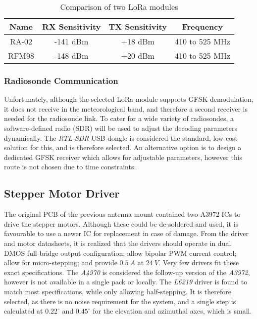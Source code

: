 \begin{table}[!htb]
  \centering
  \renewcommand{\arraystretch}{1.2}
  \begin{tabular}{ |c|c|c|c| }
  \hline
  \textbf{Name}   & \textbf{RX Sensitivity} & \textbf{TX Sensitivity}& \textbf{Frequency} \\
  \hline
  RA-02           & -141 dBm             & +18 dBm              & 410 to 525 MHz     \\
  RFM98           & -148 dBm             & +20 dBm              & 410 to 525 MHz     \\
  \hline
  \end{tabular}
  \caption{Comparison of two LoRa modules}
  \label{tab:rfModules}
\end{table}

\subsubsection{Radiosonde Communication}
Unfortunately, although the selected LoRa module supports GFSK demodulation, it does not receive in the meteorological band, and therefore a second receiver is needed for the radiosonde link. To cater for a wide variety of radiosondes, a software-defined radio (SDR) will be used to adjust the decoding parameters dynamically. The \textit{RTL-SDR} USB dongle is considered the standard, low-cost solution for this, and is therefore selected. An alternative option is to design a dedicated GFSK receiver which allows for adjustable parameters, however this route is not chosen due to time constraints.

\subsection{Stepper Motor Driver}
The original PCB of the previous antenna mount contained two A3972 ICs to drive the stepper motors. Although these could be de-soldered and used, it is favourable to use a newer IC for replacement in case of damage. From the driver and motor datasheets, it is realized that the drivers should operate in dual DMOS full-bridge output configuration; allow bipolar PWM current control; allow for micro-stepping; and provide $\SI{0.5}{A}$ at $\SI{24}{V}$. Very few drivers fit these exact specifications. The \textit{A4970} is considered the follow-up version of the \textit{A3972}, however is not available in a single pack or locally. The \textit{L6219} driver is found to match most specifications, while only allowing half-stepping. It is therefore selected, as there is no noise requirement for the system, and a single step is calculated at $0.22^\circ$ and $0.45^\circ$ for the elevation and azimuthal axes, which is small.

